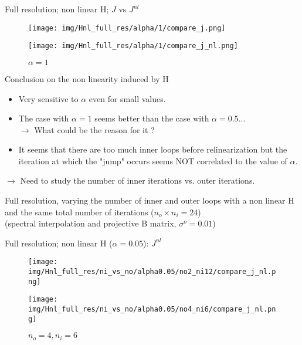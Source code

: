 \documentclass[francais]{beamer}
\begin{document}
\begin{frame}{Full resolution; non linear H; $J$ vs $J^{nl}$}
\begin{center}
\begin{figure}
  \texttt{[image: img/Hnl\_full\_res/alpha/1/compare\_j.png]}
  \caption{$\alpha = 1$}
\endminipage\hfill
{}
  \texttt{[image: img/Hnl\_full\_res/alpha/1/compare\_j\_nl.png]}
  \caption{$\alpha = 1$}
\endminipage
\end{figure}
\end{center}
\end{frame}


\begin{frame}{Conclusion on the non linearity induced by H}
 \begin{itemize}
  \item Very sensitive to $\alpha$ even for small values.
  \item The case with $\alpha = 1$ seems better than the case with $\alpha = 0.5$...\\
  $\longrightarrow$ What could be the reason for it ?
  \item It seems that there are too much inner loops before relinearization but the iteration at which the "jump" occurs seems NOT correlated to the value of $\alpha$.
 \end{itemize}
 \vspace{+0.5cm}
$\longrightarrow$ Need to study the number of inner iterations vs. outer iterations.
\end{frame}


\begin{frame}
\begin{center}
\large{Full resolution, varying the number of inner and outer loops with a non linear H and the same total number of iterations ($n_o \times n_i =24$)\\
(spectral interpolation and projective B matrix, $\sigma^o=0.01$)}
\end{center}
\end{frame}


\begin{frame}{Full resolution; non linear H ($\alpha = 0.05$): $J^{nl}$}
\begin{center}
\begin{figure}
  \texttt{[image: img/Hnl\_full\_res/ni\_vs\_no/alpha0.05/no2\_ni12/compare\_j\_nl.png]}
  \caption{$n_o = 2, n_i = 12$}
\endminipage\hfill
{}
  \texttt{[image: img/Hnl\_full\_res/ni\_vs\_no/alpha0.05/no4\_ni6/compare\_j\_nl.png]}
  \caption{$n_o = 4, n_i = 6$}
\endminipage
\end{figure}
\end{center}
\end{frame}
\end{document}
